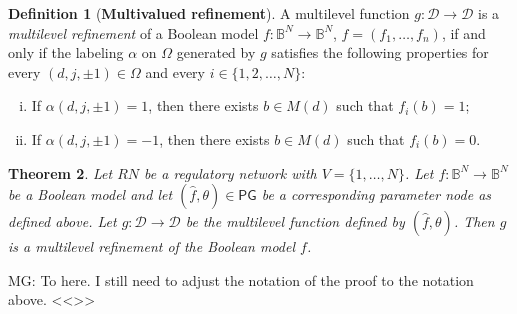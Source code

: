 \documentclass[12pt, notitlepage]{amsart}
\newcommand{\cD}{\mathcal{D}}
\newtheorem{thm}{Theorem}[section]
\theoremstyle{definition}
\newtheorem{defn}[thm]{Definition}
\newcommand{\PG}{\mathsf{PG}}
\newcommand{\bbB}{\mathbb{B}}
\begin{document}
  \begin{defn}[{\bf Multivalued refinement}\cite{Pauleve_MP}]
    A  multilevel function $g \colon \cD \to \cD$ is a \emph{multilevel refinement} of a Boolean model $f \colon \bbB^N \to \bbB^N$, $f = (f_1, \ldots, f_n)$, if and only if the labeling $\alpha$ on $\Omega$ generated by $g$ satisfies the following properties for every $(d, j, \pm 1) \in \Omega$ and every $i \in \{ 1, 2, \ldots, N \}$:
    \begin{enumerate}[(i)]
      \item If $\alpha(d,j, \pm 1) = 1$, then there exists $b \in M(d)$ such that $f_i(b) = 1$;
      \item If $\alpha(d,j, \pm 1) = -1$, then there exists $b \in M(d)$ such that $f_i(b) =0$.
    \end{enumerate}
  \end{defn}

  \begin{thm}
    Let $RN$ be a regulatory network with $V = \{ 1, \ldots, N \}$. Let $f \colon \bbB^N \to \bbB^N$ be a Boolean model and let $(\hat{f}, \theta) \in \PG$ be a corresponding parameter node as defined above. Let $g \colon \cD \to \cD$ be the multilevel function defined by $(\hat{f}, \theta)$. Then $g$ is a multilevel refinement of the Boolean model $f$.
  \end{thm}

  \corrc MG: To here. I still need to adjust the notation of the proof to the notation above.
  <<>>
\end{document}

